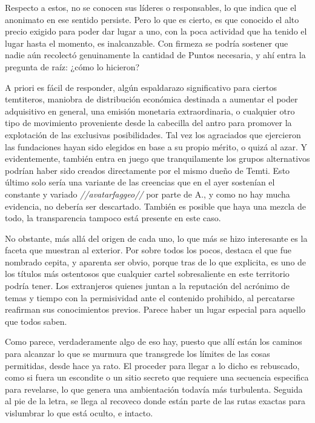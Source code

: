 \documentclass[
  spanish,
]{book}
\begin{document}
Respecto a estos, no se conocen sus líderes o responsables, lo que indica que el anonimato en ese sentido persiste. Pero lo que es cierto, es que conocido el alto precio exigido para poder dar lugar a uno, con la poca actividad que ha tenido el lugar hasta el momento, es inalcanzable. Con firmeza se podría sostener que nadie aún recolectó genuinamente la cantidad de Puntos necesaria, y ahí entra la pregunta de raíz: ¿cómo lo hicieron?

A priori es fácil de responder, algún espaldarazo significativo para ciertos temtiteros, maniobra de distribución económica destinada a aumentar el poder adquisitivo en general, una emisión monetaria extraordinaria, o cualquier otro tipo de movimiento proveniente desde la cabecilla del antro para promover la explotación de las exclusivas posibilidades. Tal vez los agraciados que ejercieron las fundaciones hayan sido elegidos en base a su propio mérito, o quizá al azar. Y evidentemente, también entra en juego que tranquilamente los grupos alternativos podrían haber sido creados directamente por el mismo dueño de Temti. Esto último solo sería una variante de las creencias que en el ayer sostenían el constante y variado \emph{//avatarfaggeo//} por parte de A., y como no hay mucha evidencia, no debería ser descartado. También es posible que haya una mezcla de todo, la transparencia tampoco está presente en este caso.

No obstante, más allá del origen de cada uno, lo que más se hizo interesante es la faceta que muestran al exterior. Por sobre todos los pocos, destaca el que fue nombrado cepita, y aparenta ser obvio, porque tras de lo que explicita, es uno de los títulos más ostentosos que cualquier cartel sobresaliente en este territorio podría tener. Los extranjeros quienes juntan a la reputación del acrónimo de temas y tiempo con la permisividad ante el contenido prohibido, al percatarse reafirman sus conocimientos previos. Parece haber un lugar especial para aquello que todos saben.

Como parece, verdaderamente algo de eso hay, puesto que allí están los caminos para alcanzar lo que se murmura que transgrede los límites de las cosas permitidas, desde hace ya rato. El proceder para llegar a lo dicho es rebuscado, como si fuera un escondite o un sitio secreto que requiere una secuencia especifica para revelarse, lo que genera una ambientación todavía más turbulenta. Seguida al pie de la letra, se llega al recoveco donde están parte de las rutas exactas para vislumbrar lo que está oculto, e intacto.
\end{document}
